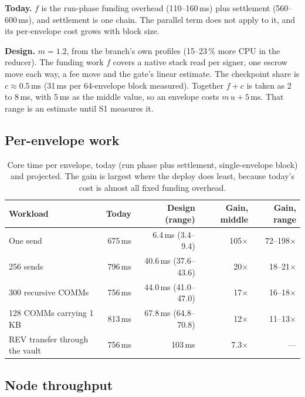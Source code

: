 \documentclass[11pt]{article}
\begin{document}
\textbf{Today.} $f$ is the run-phase funding overhead (110--160\,ms) plus settlement (560--600\,ms), and settlement is one chain. The parallel term does not apply to it, and its per-envelope cost grows with block size.

\textbf{Design.} $m = 1.2$, from the branch's own profiles (15--23\,\% more CPU in the reducer). The funding work $f$ covers a native stack read per signer, one escrow move each way, a fee move and the gate's linear estimate. The checkpoint share is $c \approx 0.5$\,ms (31\,ms per 64-envelope block measured). Together $f + c$ is taken as 2 to 8\,ms, with 5\,ms as the middle value, so an envelope costs $m\,u + 5$\,ms. That range is an estimate until S1 measures it.

\subsection{Per-envelope work}

\begin{table}[h]
\centering\small
\begin{tabular}{@{}lrrrr@{}}
\toprule
\textbf{Workload} & \textbf{Today} & \textbf{Design (range)} & \textbf{Gain, middle} & \textbf{Gain, range} \\
\midrule
One send & 675\,ms & 6.4\,ms (3.4--9.4) & 105$\times$ & 72--198$\times$ \\
256 sends & 796\,ms & 40.6\,ms (37.6--43.6) & 20$\times$ & 18--21$\times$ \\
300 recursive COMMs & 756\,ms & 44.0\,ms (41.0--47.0) & 17$\times$ & 16--18$\times$ \\
128 COMMs carrying 1\,KB & 813\,ms & 67.8\,ms (64.8--70.8) & 12$\times$ & 11--13$\times$ \\
REV transfer through the vault & 756\,ms & 103\,ms & 7.3$\times$ & --- \\
\bottomrule
\end{tabular}
\caption{Core time per envelope, today (run phase plus settlement, single-envelope block) and projected. The gain is largest where the deploy does least, because today's cost is almost all fixed funding overhead.}
\label{tab:gain}
\end{table}

\subsection{Node throughput}
\end{document}
